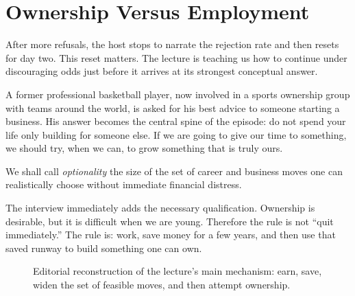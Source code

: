 \section{Ownership Versus Employment}

After more refusals, the host stops to narrate the rejection rate and then resets for day two. This reset matters. The lecture is teaching us how to continue under discouraging odds just before it arrives at its strongest conceptual answer.

A former professional basketball player, now involved in a sports ownership group with teams around the world, is asked for his best advice to someone starting a business. His answer becomes the central spine of the episode: do not spend your life only building for someone else. If we are going to give our time to something, we should try, when we can, to grow something that is truly ours.

\begin{definition}
We shall call \emph{optionality} the size of the set of career and business moves one can realistically choose without immediate financial distress.
\end{definition}

The interview immediately adds the necessary qualification. Ownership is desirable, but it is difficult when we are young. Therefore the rule is not ``quit immediately.'' The rule is: work, save money for a few years, and then use that saved runway to build something one can own.

\begin{figure}[h]
\centering
{}
\caption{Editorial reconstruction of the lecture's main mechanism: earn, save, widen the set of feasible moves, and then attempt ownership.}
\end{figure}

